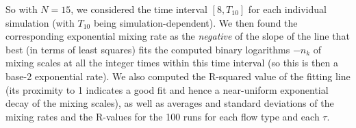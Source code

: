 \documentclass[12pt]{article}
\numberwithin{figure}{section}
\numberwithin{equation}{section}
\begin{document}
So with $N=15$, we considered the time interval $[8,T_{10}]$ for each individual simulation (with $T_{10}$ being simulation-dependent).  We then found the corresponding exponential mixing rate 
as the {\it negative} of the slope of the line that best (in terms of least squares) fits
 the computed  binary logarithms $-n_k$ of mixing scales at all the integer times within this time interval (so this is then a base-2 exponential rate).  
We also computed the R-squared value of the fitting line (its proximity to 1 indicates a good fit and hence a near-uniform exponential decay of the mixing scales), as well as averages and standard deviations of the mixing rates and the R-values for the 100 runs for each flow type and each $\tau$.



\end{document}
